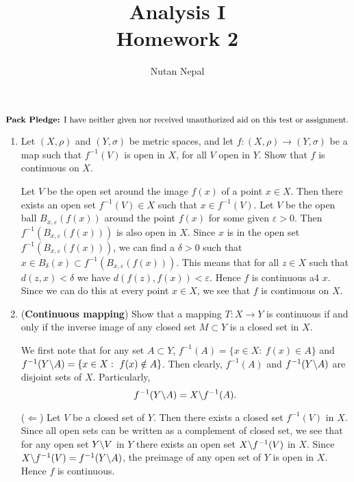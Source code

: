 \documentclass[12pt]{article}
\title{Analysis I \\
\large Homework 2
}
\author{Nutan Nepal}
\newcommand{\packpledge}{
    $\text{{\bf Pack Pledge:} I have neither given nor
    received unauthorized aid on this
    test or assignment.}$}
\begin{document}
\maketitle
\packpledge\\
\makebox[\linewidth]{\rule{200mm}{1pt}}
\vspace{1mm}

\begin{enumerate}

\item Let $(X, \rho)$ and $(Y, \sigma)$ be metric spaces,
    and let $f: (X, \rho) \to (Y, \sigma)$ be a map
    such that $f^{-1}(V)$ is open in $X$, for all
    $V$ open in $Y$. Show that $f$ is continuous on $X$. 

\begin{mybox}

    Let $V$ be the open set around the image $f(x)$ of a
    point $x\in X$. Then there exists an open set $f^{-1}
    (V)\in X$ such that $x\in f^{-1}(V)$.
    Let $V$ be the open ball
    $B_{x,\varepsilon}(f(x))$ around the point $f(x)$
    for some given $\varepsilon>0$.
    Then $f^{-1}(B_{x,\varepsilon}(f(x)))$ is also open in
    $X$. Since $x$ is in the open set
    $f^{-1}(B_{x,\varepsilon}(f(x)))$, we can find a
    $\delta>0$ such that $x\in B_\delta(x)\subset
    f^{-1}(B_{x,\varepsilon}(f(x)))$. This means that
    for all $z\in X$ such that
    $d(z,x)<\delta$ we have $d(f(z),f(x))<\varepsilon$.
    Hence $f$ is continuous a4 $x$. Since we can
    do this at every point $x\in X$, we see that $f$ is
    continuous on $X$.
\end{mybox}


\item ({\bf Continuous mapping}) Show that a
    mapping $T: X\to Y$ is continuous
    if and only if the inverse image of any closed
    set $M\subset Y$ is a closed
    set in $X$.
\begin{mybox}

    We first note that for any set $A\subset Y$,
    $f^{-1}(A)=\{x\in X:\ f(x)\in A\}$ and
    $f^{-1}(Y\char`\\A)=\{x\in X:\ f(x) \notin A\}$.
    Then clearly, $f^{-1}(A)$ and $f^{-1}(Y\char`\\A)$
    are disjoint sets of $X$. Particularly,
    $$f^{-1}(Y\char`\\A)=X\char`\\f^{-1}(A).$$

    \vspace*{3mm}
    ($\Longleftarrow$)
    Let $V$ be a closed set of $Y$. Then there exists
    a closed set $f^{-1}(V)$ in  $X$. Since all open
    sets can be written as a complement of closed set,
    we see that for any open set $Y\char`\\V$ in $Y$
    there exists an open set $X\char`\\f^{-1}(V)$ in
    $X$. Since $X\char`\\f^{-1}(V)=f^{-1}(Y\char`\\A)$,
    the preimage of any open set of $Y$ is open in
    $X$. Hence $f$ is continuous.


\end{mybox}
\end{enumerate}
\end{document}
